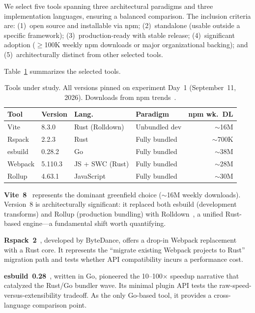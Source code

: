 \documentclass[preprint,12pt]{elsarticle}
\begin{document}
We select five tools spanning three architectural paradigms and three implementation languages, ensuring a balanced comparison.
The inclusion criteria are: (1)~open source and installable via npm; (2)~standalone (usable outside a specific framework); (3)~production-ready with stable release; (4)~significant adoption ($\geq$100K weekly npm downloads or major organizational backing); and (5)~architecturally distinct from other selected tools.

Table~\ref{tab:tools} summarizes the selected tools.

\begin{table}[htbp]
\centering
\caption{Tools under study. All versions pinned on experiment Day~1 (September~11, 2026). Downloads from npm trends~\protect\cite{npmtrends2026}.}\label{tab:tools}
\begin{tabular}{@{}llllr@{}}
\toprule
\textbf{Tool} & \textbf{Version} & \textbf{Lang.} & \textbf{Paradigm} & \textbf{npm wk.\ DL} \\
\midrule
Vite     & 8.3.0   & Rust (Rolldown) & Unbundled dev  & $\sim$16M \\
Rspack   & 2.2.3   & Rust            & Fully bundled  & $\sim$700K \\
esbuild  & 0.28.2  & Go              & Fully bundled  & $\sim$38M \\
Webpack  & 5.110.3 & JS + SWC (Rust) & Fully bundled  & $\sim$28M \\
Rollup   & 4.63.1  & JavaScript      & Fully bundled  & $\sim$30M \\
\bottomrule
\end{tabular}
\end{table}

\textbf{Vite~8}~\cite{vite2026} represents the dominant greenfield choice ($\sim$16M weekly downloads). Version~8 is architecturally significant: it replaced both esbuild (development transforms) and Rollup (production bundling) with Rolldown~\cite{rolldown2026}, a unified Rust-based engine---a fundamental shift worth quantifying.

\textbf{Rspack~2}~\cite{rspack2026}, developed by ByteDance, offers a drop-in Webpack replacement with a Rust core. It represents the ``migrate existing Webpack projects to Rust'' migration path and tests whether API compatibility incurs a performance cost.

\textbf{esbuild~0.28}~\cite{esbuild2026}, written in Go, pioneered the 10--100$\times$ speedup narrative that catalyzed the Rust/Go bundler wave. Its minimal plugin API tests the raw-speed-versus-extensibility tradeoff. As the only Go-based tool, it provides a cross-language comparison point.
\end{document}
